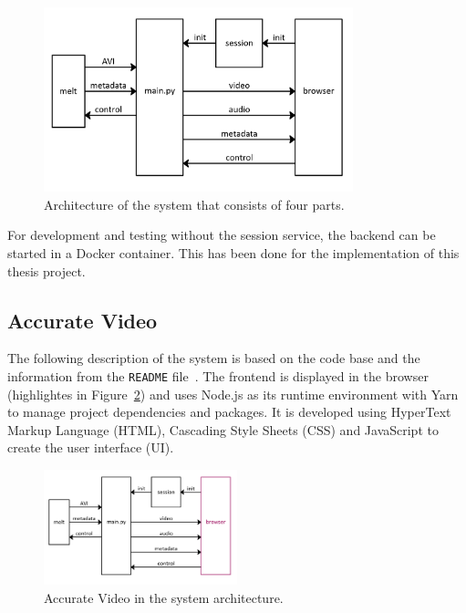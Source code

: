 \documentclass[../MasterThesis.tex]{subfiles}
\begin{document}
\begin{figure}[H]
	\centering
	\includegraphics[width=0.8\textwidth]{IM3.png}
	\caption[Architecture of the system that consists of four parts.]{Architecture of the system that consists of four parts.}
	\label{figure:SA}
\end{figure}


For development and testing without the session service, the backend can be started in a Docker container. This has been done for the implementation of this thesis project.







\subsection{Accurate Video} \label{subsection:accuratevideo}

The following description of the system is based on the code base and the information from the \texttt{README} file~\cite{RM_Frontend}.
%
The frontend is displayed in the browser (highlightes in Figure~\ref{figure:AS_frontend}) and uses Node.js as its runtime environment with Yarn to manage project dependencies and packages. It is developed using HyperText Markup Language (HTML), Cascading Style Sheets (CSS) and JavaScript to create the user interface (UI).


\begin{figure}[H]
	\centering
	\includegraphics[width=0.5\textwidth]{IM_FE.png}
	\caption{Accurate Video in the system architecture.}
	\label{figure:AS_frontend}
\end{figure}
\end{document}
